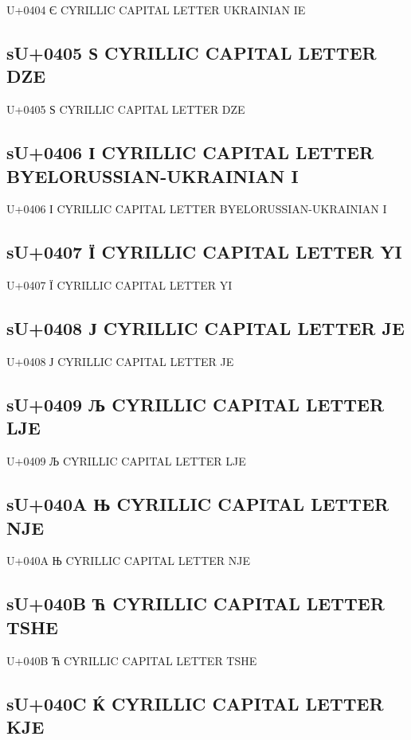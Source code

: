 U+0404 Є  CYRILLIC CAPITAL LETTER UKRAINIAN IE

\subsection{sU+0405 Ѕ  CYRILLIC CAPITAL LETTER DZE}

U+0405 Ѕ  CYRILLIC CAPITAL LETTER DZE

\subsection{sU+0406 І  CYRILLIC CAPITAL LETTER BYELORUSSIAN-UKRAINIAN I}

U+0406 І  CYRILLIC CAPITAL LETTER BYELORUSSIAN-UKRAINIAN I

\subsection{sU+0407 Ї  CYRILLIC CAPITAL LETTER YI}

U+0407 Ї  CYRILLIC CAPITAL LETTER YI

\subsection{sU+0408 Ј  CYRILLIC CAPITAL LETTER JE}

U+0408 Ј  CYRILLIC CAPITAL LETTER JE

\subsection{sU+0409 Љ  CYRILLIC CAPITAL LETTER LJE}

U+0409 Љ  CYRILLIC CAPITAL LETTER LJE

\subsection{sU+040A Њ  CYRILLIC CAPITAL LETTER NJE}

U+040A Њ  CYRILLIC CAPITAL LETTER NJE

\subsection{sU+040B Ћ  CYRILLIC CAPITAL LETTER TSHE}

U+040B Ћ  CYRILLIC CAPITAL LETTER TSHE

\subsection{sU+040C Ќ  CYRILLIC CAPITAL LETTER KJE}


